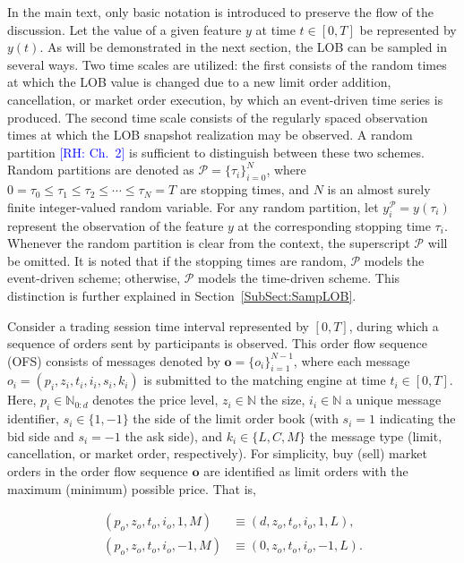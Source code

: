 \documentclass[10pt,a4paper,oneside]{article}
\newcommand{\rh}[1]{\textcolor{blue}{\textsf{[RH: #1]}}}
\begin{document}
In the main text, only basic notation is introduced to preserve the flow of the discussion. Let the value of a given feature $y$ at time $t \in [0, T]$ be represented by $y(t)$. As will be demonstrated in the next section, the LOB can be sampled in several ways. Two time scales are utilized: the first consists of the random times at which the LOB value is changed due to a new limit order addition, cancellation, or market order execution, by which an event-driven time series is produced. The second time scale consists of the regularly spaced observation times at which the LOB snapshot realization may be observed. A random partition \citep[ch.~2]{Protter2005} \rh{Ch.~2} is sufficient to distinguish between these two schemes. Random partitions are denoted as \( \mathcal{P} = \{\tau_i\}_{i=0}^N \), where \( 0 = \tau_0 \leq \tau_1 \leq \tau_2 \leq \cdots \leq \tau_N = T \) are stopping times, and \( N \) is an almost surely finite integer-valued random variable. For any random partition, let $y_i^{\mathcal{P}} = y(\tau_i)$ represent the observation of the feature $y$ at the corresponding stopping time $\tau_i$. Whenever the random partition is clear from the context, the superscript $\mathcal{P}$ will be omitted. It is noted that if the stopping times are random, $\mathcal{P}$ models the event-driven scheme; otherwise, $\mathcal{P}$ models the time-driven scheme. This distinction is further explained in Section~\ref{SubSect:SampLOB}.

Consider a trading session time interval represented by $[0, T]$, during which a sequence of orders sent by participants is observed. This order flow sequence (OFS) consists of messages denoted by $\mathbf{o} = \{o_i\}_{i=1}^{N-1}$, where each message $o_i = (p_i, z_i, t_i, i_i, s_i, k_i)$ is submitted to the matching engine at time $t_i \in [0, T]$. Here, $p_i \in \mathbb{N}_{0:d}$ denotes the price level, $z_i \in \mathbb{N}$ the size, $i_i \in \mathbb{N}$ a unique message identifier, $s_i \in \{1, -1\}$ the side of the limit order book (with $s_i = 1$ indicating the bid side and $s_i = -1$ the ask side), and $k_i \in \{L, C, M\}$ the message type (limit, cancellation, or market order, respectively). For simplicity, buy (sell) market orders in the order flow sequence $\mathbf{o}$ are identified as limit orders with the maximum (minimum) possible price. That is,

\begin{align*}
    (p_o, z_o, t_o, i_o, 1,  M) & \equiv (d, z_o, t_o, i_o, 1, L),  \\
    (p_o, z_o, t_o, i_o, -1, M) & \equiv (0, z_o, t_o, i_o, -1, L).
\end{align*}
\end{document}
